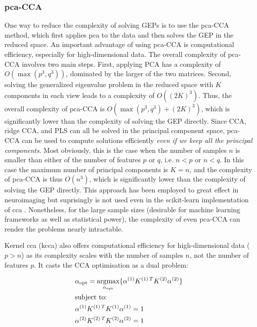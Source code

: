 \subsubsection{\acrshort{pca}-CCA}

One way to reduce the complexity of solving GEPs is to use the \acrshort{pca}-CCA method, which first applies \acrshort{pca} to the data and then solves the GEP in the reduced space.
An important advantage of using \acrshort{pca}-CCA is computational efficiency, especially for high-dimensional data.
The overall complexity of \acrshort{pca}-CCA involves two main steps.
First, applying PCA has a complexity of \( O(\max(p^3, q^3)) \), dominated by the larger of the two matrices.
Second, solving the generalized eigenvalue problem in the reduced space with \( K \) components in each view leads to a complexity of \( O((2K)^3) \).
Thus, the overall complexity of \acrshort{pca}-CCA is \( O(\max(p^3, q^3) + (2K)^3) \), which is significantly lower than the complexity of solving the GEP directly.
Since CCA, ridge CCA, and PLS can all be solved in the principal component space, \acrshort{pca}-CCA can be used to compute solutions efficiently \textit{even if we keep all the principal components}.
Most obviously, this is the case when the number of samples \( n \) is smaller than either of the number of features \( p \) or \( q \), i.e. \( n < p \) or \( n < q \).
In this case the maximum number of principal components is \( K=n \), and the complexity of \acrshort{pca}-CCA is thus \( O(n^3) \), which is significantly lower than the complexity of solving the GEP directly.
This approach has been employed to great effect in neuroimaging but suprisingly is not used even in the scikit-learn implementation of \acrshort{cca} \citep{pedregosa2011scikit}.
Nonetheless, for the large sample sizes (desirable for machine learning frameworks as well as statistical power), the complexity of even \acrshort{pca}-CCA can render the problems nearly intractable.

Kernel \acrshort{cca} (\acrshort{kcca}) also offers computational efficiency for high-dimensional data (\(p>n\)) as its complexity scales with the number of samples \(n\), not the number of features \(p\).
It casts the CCA optimisation as a dual problem:

\begin{align}
    & \alpha_{\text{opt}}=\underset{\alpha_{\text{opt}}}{\mathrm{argmax}}\{ \alpha^{(1)}K^{(1)\,T}K^{(2)}\alpha^{(2)}  \} \\
    & \text{subject to:} \notag                                                                                            \\
    & \alpha^{(1)}K^{(1)\,T}K^{(1)}\alpha^{(1)}=1 \notag                                                                  \\
    & \alpha^{(2)}K^{(2)\,T}K^{(2)}\alpha^{(2)}=1 \notag
\end{align}

